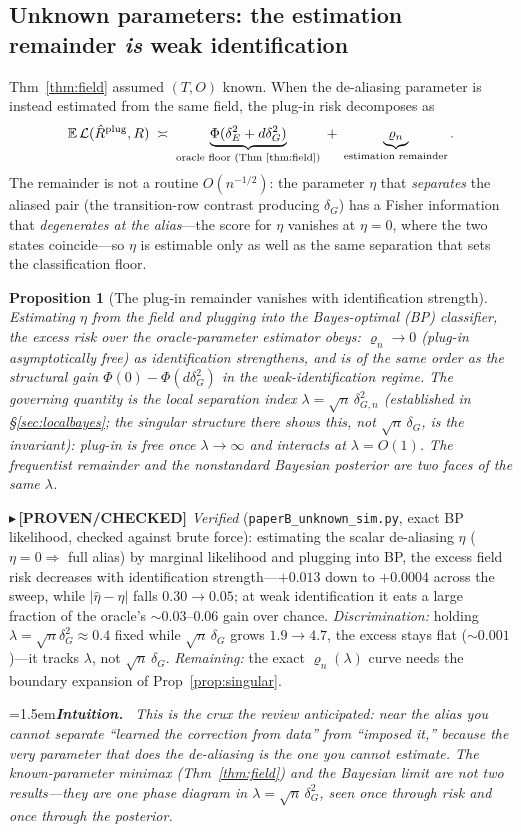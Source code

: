 \documentclass[11pt]{article}
\newtheorem{proposition}{Proposition}
\newcommand{\PROVEN}[1]{{\color{teal}\small$\blacktriangleright$\,\textbf{[PROVEN/CHECKED]} #1}}
\newenvironment{intuition}{\par\smallskip\noindent\hangindent=1.5em\textbf{\itshape Intuition.}\itshape\ \ignorespaces}{\par\smallskip}
\begin{document}
\subsection{Unknown parameters: the estimation remainder \emph{is} weak identification}\label{sec:unknown}
Thm~\ref{thm:field} assumed $(T,O)$ known. When the de-aliasing parameter is instead estimated from the same
field, the plug-in risk decomposes as
\[
   \mathbb{E}\,\mathcal L(\hat R^{\text{plug}},R)\;\asymp\;\underbrace{\Phi(\delta_E^2+d\delta_G^2)}_{\text{oracle floor (Thm~\ref{thm:field})}}\;+\;\underbrace{\varrho_n}_{\text{estimation remainder}} .
\]
The remainder is not a routine $O(n^{-1/2})$: the parameter $\eta$ that \emph{separates} the aliased pair (the
transition-row contrast producing $\delta_G$) has a Fisher information that \emph{degenerates at the alias}---the
score for $\eta$ vanishes at $\eta{=}0$, where the two states coincide---so $\eta$ is estimable only as well as
the same separation that sets the classification floor.
\begin{proposition}[The plug-in remainder vanishes with identification strength]\label{prop:unknown}
Estimating $\eta$ from the field and plugging into the Bayes-optimal (BP) classifier, the excess risk over the
oracle-parameter estimator obeys: $\varrho_n\to0$ (\emph{plug-in asymptotically free}) as identification
strengthens, and is of the \emph{same order as the structural gain} $\Phi(0)-\Phi(d\delta_G^2)$ in the
weak-identification regime. The governing quantity is the local separation index
$\lambda=\sqrt n\,\delta_{G,n}^2$ (established in \S\ref{sec:localbayes}; the singular structure there shows this,
\emph{not} $\sqrt n\,\delta_G$, is the invariant): plug-in is free once $\lambda\to\infty$ and interacts at
$\lambda=O(1)$. The frequentist remainder and the nonstandard Bayesian posterior are two faces of the same
$\lambda$.
\end{proposition}
\PROVEN{\emph{Verified} (\texttt{paperB\_unknown\_sim.py}, exact BP likelihood, checked against brute force):
estimating the scalar de-aliasing $\eta$ ($\eta{=}0\Rightarrow$ full alias) by marginal likelihood and plugging
into BP, the excess field risk decreases with identification strength---$+0.013$ down to $+0.0004$ across the
sweep, while $|\hat\eta-\eta|$ falls $0.30\!\to\!0.05$; at weak identification it eats a large fraction of the
oracle's $\sim\!0.03$--$0.06$ gain over chance. \emph{Discrimination:} holding $\lambda=\sqrt n\delta_G^2\approx0.4$
fixed while $\sqrt n\,\delta_G$ grows $1.9\!\to\!4.7$, the excess stays flat ($\sim\!0.001$)---it tracks $\lambda$,
not $\sqrt n\,\delta_G$. \emph{Remaining:} the exact $\varrho_n(\lambda)$ curve needs the boundary expansion of
Prop~\ref{prop:singular}.}
\begin{intuition}
This is the crux the review anticipated: near the alias you cannot separate ``learned the correction from data''
from ``imposed it,'' because the very parameter that does the de-aliasing is the one you cannot estimate. The
known-parameter minimax (Thm~\ref{thm:field}) and the Bayesian limit are not two results---they are one
phase diagram in $\lambda=\sqrt n\,\delta_G^2$, seen once through risk and once through the posterior.
\end{intuition}
\end{document}
